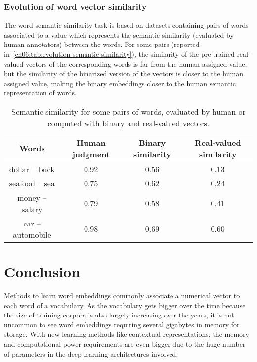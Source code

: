     \subsubsection{Evolution of word vector similarity}
      The word semantic similarity task is based on datasets containing pairs of
      words associated to a value which represents the semantic similarity
      (evaluated by human annotators) between the words. For some pairs
      (reported in~\autoref{ch06:tab:evolution-semantic-similarity}), the
      similarity of the pre-trained real-valued vectors of the corresponding
      words is far from the human assigned value, but the similarity of the
      binarized version of the vectors is closer to the human assigned value,
      making the binary embeddings closer to the human semantic representation
      of words.
      \begin{table}[h!]
        \centering
        \begin{tabular}{cccc}
          \toprule[0.15em]
          Words              & Human judgment & Binary similarity & Real-valued similarity   \\
          \midrule
          dollar -- buck     &    0.92        &  0.56             &  0.13 \\
          seafood -- sea     &    0.75        &  0.62             &  0.24 \\
          money -- salary    &    0.79        &  0.58             &  0.41 \\
          car -- automobile  &    0.98        &  0.69             &  0.60 \\
          \bottomrule[0.15em]
        \end{tabular}
        \caption[Evolution of semantic similarity of pairs of words after the
        binarization.]{Semantic similarity for some pairs of words, evaluated by
        human or computed with binary and real-valued vectors.}
        \label{ch06:tab:evolution-semantic-similarity}
      \end{table}

\section{Conclusion}
  Methods to learn word embeddings commonly associate a numerical vector to each
  word of a vocabulary. As the vocabulary gets bigger over the time because the
  size of training corpora is also largely increasing over the years, it is not
  uncommon to see word embeddings requiring several gigabytes in memory for
  storage. With new learning methods like contextual representations, the memory
  and computational power requirements are even bigger due to the huge number of
  parameters in the deep learning architectures involved. \medskip

